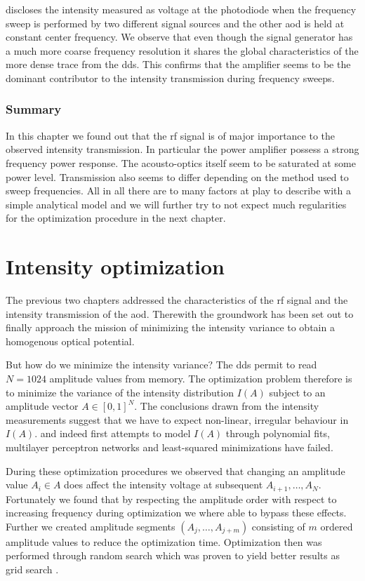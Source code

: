  discloses the intensity
measured as voltage at the photodiode when the frequency sweep is performed
by two different signal sources and the other \gls{aod} is held at constant
center frequency. We observe that even though the signal generator has a much
more coarse frequency resolution it shares the global characteristics of
the more dense trace from the \gls{dds}. This confirms that the amplifier
seems to be the dominant contributor to the intensity transmission during
frequency sweeps.

\subsubsection{Summary}

In this chapter we found out that the \gls{rf} signal is of major importance
to the observed intensity transmission. In particular the power amplifier
possess a strong frequency power response. The acousto-optics itself seem to
be saturated at some power level. Transmission also seems to differ depending
on the method used to sweep frequencies. All in all there are to many factors
at play to describe with a simple analytical model and we will further try to
not expect much regularities for the optimization procedure in the next
chapter.

\section{Intensity optimization}

The previous two chapters addressed the characteristics of the \gls{rf}
signal and the intensity transmission of the \gls{aod}. Therewith the
groundwork has been set out to finally approach the mission of minimizing the
intensity variance to obtain a homogenous optical potential.

But how do we minimize the intensity variance? The \gls{dds} permit to read
$N=1024$ amplitude values from memory. The optimization problem therefore is to
minimize the variance of the intensity distribution $I(A)$ subject to an
amplitude vector $A\in[0,1]^N$. The conclusions drawn from the intensity
measurements suggest that we have to expect non-linear, irregular behaviour
in $I(A)$. and indeed first attempts to model $I(A)$ through polynomial fits,
multilayer perceptron networks and least-squared minimizations have failed.

During these optimization procedures we observed that changing an amplitude
value $A_i\in A$ does affect the intensity voltage at subsequent
$A_{i+1},\dots,A_N$. Fortunately we found that by respecting the amplitude
order with respect to increasing frequency during optimization we where able
to bypass these effects. Further we created amplitude segments
$\left(A_j,\dots,A_{j+m}\right)$ consisting of $m$ ordered amplitude values
to reduce the optimization time. Optimization then was performed through
random search which was proven to yield better results as grid search
\cite{Bergstra2012}.

